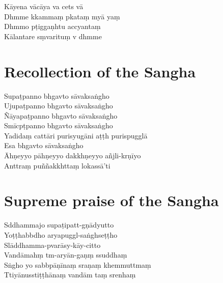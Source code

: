 \clearpage


Kāyena vācāya va cets vā\\
Dhmme kkammaṃ pkataṃ myā yaṃ\\
Dhmmo pṭiggaṇhtu accyantaṃ\\
Kālantare sṃvarituṃ v dhmme

\chapter{Recollection of the Sangha}%

\begin{leader}
\end{leader}

Supaṭpanno bhgavto sāvaksaṅgho\\
Ujupaṭpanno bhgavto sāvaksaṅgho\\
Ñāyapaṭpanno bhgavto sāvaksaṅgho\\
Smīcpṭpanno bhgavto sāvaksaṅgho\\
Yadidaṃ cattāri purisyugāni aṭṭh purispugglā\\
Esa bhgavto sāvaksaṅgho\\
Āhṇeyyo pāhṇeyyo dakkhṇeyyo añjli-krṇīyo\\
Anttraṃ puññakkhttaṃ lokassā'ti

\chapter{Supreme praise of the Sangha}%

\begin{leader}
\end{leader}

Sddhammajo supaṭipatt-gṇādyutto\\
Yoṭṭhabbdho aryapuggl-saṅghseṭṭho\\
Slāddhamma-pvarāsy-kāy-citto\\
Vandāmahṃ tm-aryān-gaṇṃ ssuddhaṃ\\
Sṅgho yo sabbpāṇīnaṃ sraṇaṃ khemmuttmaṃ\\
Ttiyānusstiṭṭhānaṃ vandām taṃ srenhaṃ

